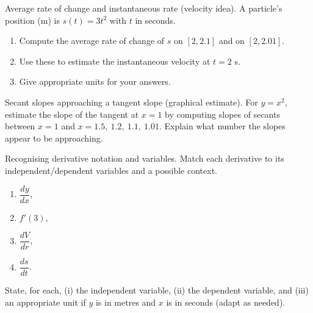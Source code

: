 \documentclass[11pt]{article}
\def\textbf#1{#1}%
\newcounter{question}
\begin{document}
\begin{question}
\textbf{Average rate of change and instantaneous rate (velocity idea).}
A particle’s position (m) is $s(t)=3t^{2}$ with $t$ in seconds.
\begin{enumerate}
  \item Compute the average rate of change of $s$ on $[2,2.1]$ and on $[2,2.01]$.
  \item Use these to estimate the instantaneous velocity at $t=2$ s.
  \item Give appropriate units for your answers.
\end{enumerate}
\end{question}

\begin{question}
\textbf{Secant slopes approaching a tangent slope (graphical estimate).}
For $y=x^{2}$, estimate the slope of the tangent at $x=1$ by computing slopes of secants between $x=1$ and
$x=1.5,\ 1.2,\ 1.1,\ 1.01$. Explain what number the slopes appear to be approaching.
\begin{center}
\end{center}
\end{question}

\begin{question}
\textbf{Recognising derivative notation and variables.}
Match each derivative to its independent/dependent variables and a possible context.
\begin{enumerate}
  \item $\dfrac{dy}{dx}$, \quad \ \ \item $f'(3)$, \quad \ \ \item $\dfrac{dV}{dr}$, \quad \ \ \item $\dfrac{ds}{dt}$.
\end{enumerate}
State, for each, (i) the independent variable, (ii) the dependent variable, and (iii) an appropriate unit if $y$ is in metres and $x$ is in seconds (adapt as needed).
\end{question}
\end{document}
